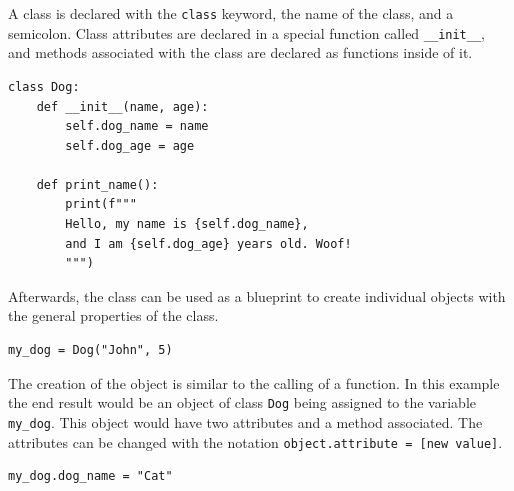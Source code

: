 \documentclass[a4paper,12pt]{article}
\begin{document}
A class is declared with the \verb|class| keyword, the name of the class, and a semicolon. Class attributes are declared in a special function called \verb|__init__|, and methods associated with the class are declared as functions inside of it.

\begin{tcolorbox}[
    enhanced,
    attach boxed title to top left={xshift=6mm,yshift=-3mm},
    colback=lightgreen!20,
    colframe=lightgreen,
    colbacktitle=lightgreen,
    title=Python,
    fonttitle=\bfseries\color{black},
    boxed title style={size=small,colframe=lightgreen,sharp corners},
    sharp corners,
    ]
    \begin{verbatim}
class Dog:
    def __init__(name, age):
        self.dog_name = name
        self.dog_age = age

    def print_name():
        print(f"""
        Hello, my name is {self.dog_name},
        and I am {self.dog_age} years old. Woof!
        """)
    \end{verbatim}
\end{tcolorbox}

Afterwards, the class can be used as a blueprint to create individual objects with the general properties of the class.

\begin{tcolorbox}[
    enhanced,
    attach boxed title to top left={xshift=6mm,yshift=-3mm},
    colback=lightgreen!20,
    colframe=lightgreen,
    colbacktitle=lightgreen,
    title=Python,
    fonttitle=\bfseries\color{black},
    boxed title style={size=small,colframe=lightgreen,sharp corners},
    sharp corners,
    ]
    \begin{verbatim}
my_dog = Dog("John", 5)
    \end{verbatim}
\end{tcolorbox}

The creation of the object is similar to the calling of a function. In this example the end result would be an object of class \verb|Dog| being assigned to the variable \verb|my_dog|. This object would have two attributes and a method associated. The attributes can be changed with the notation \verb|object.attribute = [new value]|.

\begin{tcolorbox}[
    enhanced,
    attach boxed title to top left={xshift=6mm,yshift=-3mm},
    colback=lightgreen!20,
    colframe=lightgreen,
    colbacktitle=lightgreen,
    title=Python,
    fonttitle=\bfseries\color{black},
    boxed title style={size=small,colframe=lightgreen,sharp corners},
    sharp corners,
    ]
    \begin{verbatim}
my_dog.dog_name = "Cat"
    \end{verbatim}
\end{tcolorbox}
\end{document}
